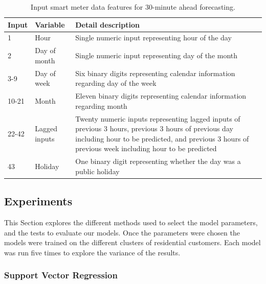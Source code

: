 \begin{table}
	\begin{tabular}{p{3cm}p{3cm}p{8cm}}
		\toprule
		Input & Variable      & Detail description \\
		\midrule
		1     & Hour          & Single numeric input representing hour of the day                                                                                              \\
		2     & Day of month  & Single numeric input representing day of the month                                                                                             \\
		3-9   & Day of week   & Six binary digits representing calendar information regarding day of the week                                                                                            \\
		10-21 & Month         & Eleven binary digits representing calendar information regarding month                                                                                         \\
		22-42 & Lagged inputs & Twenty numeric inputs representing lagged inputs of previous 3 hours, previous 3 hours of previous day including hour to be predicted, and previous 3 hours of previous week including hour to be predicted \\
		43    & Holiday       & One binary digit representing whether the day was a public holiday  \\     \bottomrule                                                           
	\end{tabular}
	\caption{Input smart meter data features for 30-minute ahead forecasting.}
	\label{tab:feature}
\end{table}


\subsection{Experiments}

This Section explores the different methods used to select the model parameters, and the tests to evaluate our models. Once the parameters were chosen the models were trained on the different clusters of residential customers. Each model was run five times to explore the variance of the results.  

\subsubsection{Support Vector Regression}

